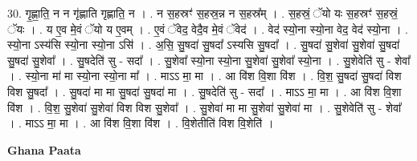 \documentclass[17pt]{extarticle}
\begin{document}
30. गृ॒ह्णा॒ति॒ न न गृ॑ह्णाति गृह्णाति॒ न । . न स॒हस्रꣳ॑ स॒हस्र॒न्न न स॒हस्र᳚म् । . स॒हस्रं॒ ॅयो यः स॒हस्रꣳ॑ स॒हस्रं॒ ॅयः । . य ए॒व मे॒वं ॅयो य ए॒वम् । . ए॒वं ॅवेद॒ वेदै॒व मे॒वं ॅवेद॑ । . वेद॑ स्यो॒ना स्यो॒ना वेद॒ वेद॑ स्यो॒ना । . स्यो॒ना ऽस्य॑सि स्यो॒ना स्यो॒ना ऽसि॑ । . अ॒सि॒ सु॒षदा॑ सु॒षदा᳚ ऽस्यसि सु॒षदा᳚ । . सु॒षदा॑ सु॒शेवा॑ सु॒शेवा॑ सु॒षदा॑ सु॒षदा॑ सु॒शेवा᳚ । . सु॒षदेति॑ सु - सदा᳚ । . सु॒शेवा᳚ स्यो॒ना स्यो॒ना सु॒शेवा॑ सु॒शेवा᳚ स्यो॒ना । . सु॒शेवेति॑ सु - शेवा᳚ । . स्यो॒ना मा॑ मा स्यो॒ना स्यो॒ना मा᳚ । . माऽऽ मा॒ मा । . आ वि॑श वि॒शा वि॑श । . वि॒श॒ सु॒षदा॑ सु॒षदा॑ विश विश सु॒षदा᳚ । . सु॒षदा॑ मा मा सु॒षदा॑ सु॒षदा॑ मा । . सु॒षदेति॑ सु - सदा᳚ । . माऽऽ मा॒ मा । . आ वि॑श वि॒शा वि॑श । . वि॒श॒ सु॒शेवा॑ सु॒शेवा॑ विश विश सु॒शेवा᳚ । . सु॒शेवा॑ मा मा सु॒शेवा॑ सु॒शेवा॑ मा । . सु॒शेवेति॑ सु - शेवा᳚ । . माऽऽ मा॒ मा । . आ वि॑श वि॒शा वि॑श । . वि॒शेतीति॑ विश वि॒शेति॑ । \newline

\textbf{Ghana Paata } \newline
\end{document}
